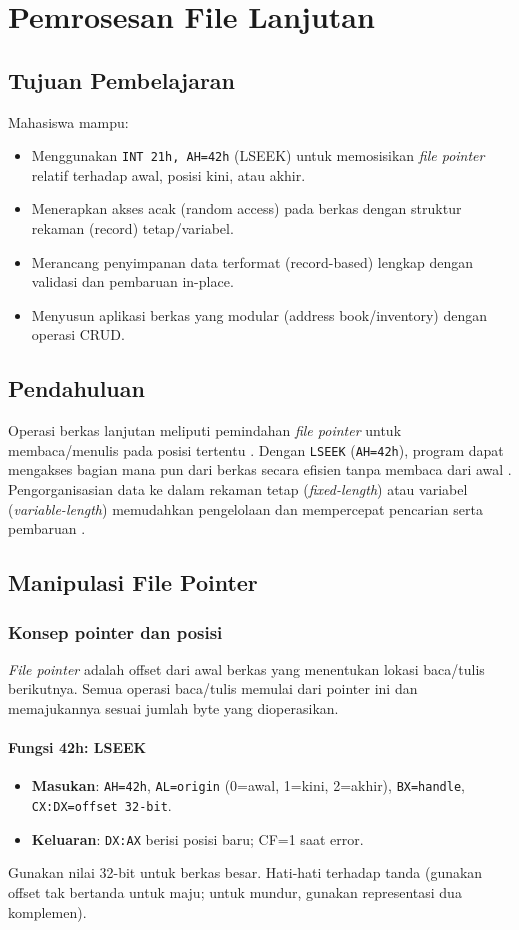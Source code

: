 \chapter{Pemrosesan File Lanjutan}

\section{Tujuan Pembelajaran}
Mahasiswa mampu:
\begin{itemize}
    \item Menggunakan \texttt{INT 21h, AH=42h} (LSEEK) untuk memosisikan \textit{file pointer} relatif terhadap awal, posisi kini, atau akhir.
    \item Menerapkan akses acak (random access) pada berkas dengan struktur rekaman (record) tetap/variabel.
    \item Merancang penyimpanan data terformat (record-based) lengkap dengan validasi dan pembaruan in-place.
    \item Menyusun aplikasi berkas yang modular (address book/inventory) dengan operasi CRUD.
\end{itemize}

\section{Pendahuluan}
Operasi berkas lanjutan meliputi pemindahan \textit{file pointer} untuk membaca/menulis pada posisi tertentu \cite{susanto1995belajar}. Dengan \texttt{LSEEK} (\texttt{AH=42h}), program dapat mengakses bagian mana pun dari berkas secara efisien tanpa membaca dari awal \cite{hyde2010art}. Pengorganisasian data ke dalam rekaman tetap (\textit{fixed-length}) atau variabel (\textit{variable-length}) memudahkan pengelolaan dan mempercepat pencarian serta pembaruan \cite{nopi2003tutorial}.

\section{Manipulasi File Pointer}
\subsection{Konsep pointer dan posisi}
\textit{File pointer} adalah offset dari awal berkas yang menentukan lokasi baca/tulis berikutnya. Semua operasi baca/tulis memulai dari pointer ini dan memajukannya sesuai jumlah byte yang dioperasikan.

\subsubsection{Fungsi 42h: LSEEK}
\begin{itemize}
  \item \textbf{Masukan}: \texttt{AH=42h}, \texttt{AL=origin} (0=awal, 1=kini, 2=akhir), \texttt{BX=handle}, \texttt{CX:DX=offset 32-bit}.
  \item \textbf{Keluaran}: \texttt{DX:AX} berisi posisi baru; CF=1 saat error.
\end{itemize}
Gunakan nilai 32-bit untuk berkas besar. Hati-hati terhadap tanda (gunakan offset tak bertanda untuk maju; untuk mundur, gunakan representasi dua komplemen).

